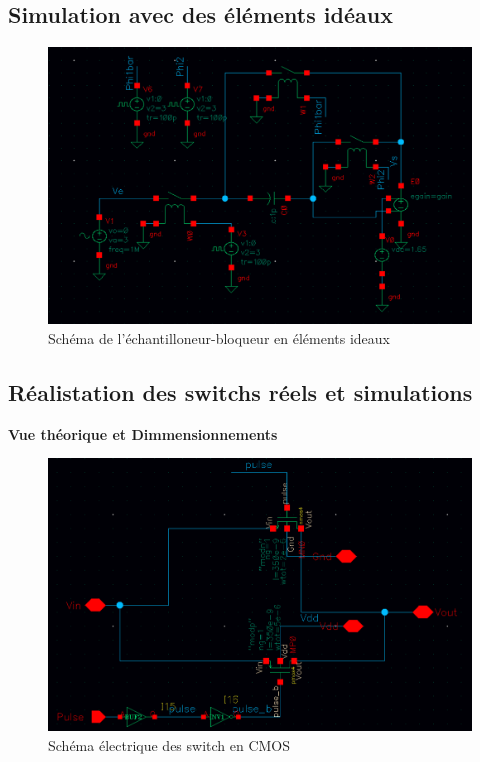 \documentclass[11pt]{article}
\begin{document}
\clearpage

\subsection{Simulation avec des \'el\'ements id\'eaux}

\begin{figure}[!htb]
\begin{center}
  \includegraphics[scale=0.35]{Echantillonneur-bloqueur_ideal.png}
  \caption{Sch\'ema de l'\'echantilloneur-bloqueur en \'el\'ements ideaux}
\end{center}
\end{figure}

\clearpage

\subsection{R\'ealistation des switchs r\'eels et simulations}

\textbf{Vue th\'eorique et Dimmensionnements}

\begin{figure}[!htb]
\begin{center}
  \includegraphics[width=0.8\linewidth]{switchs_.png}
  \caption{Sch\'ema \'electrique des switch en CMOS}
\end{center}
\end{figure}
\end{document}
